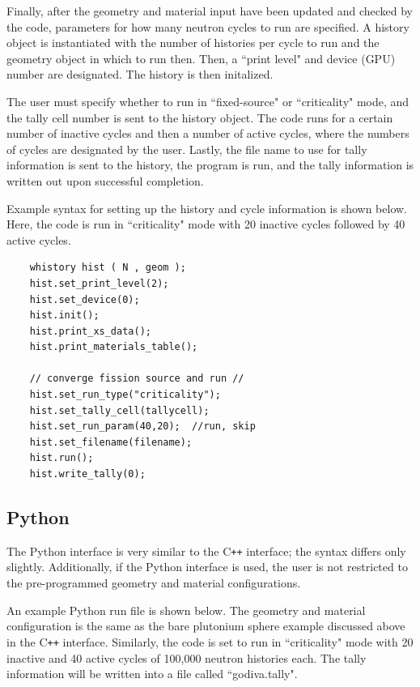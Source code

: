 \documentclass[twoside,a4paper]{refart}
\begin{document}
Finally, after the geometry and material input have been updated and checked by the code, parameters for how many neutron cycles to run are specified. A history object is instantiated with the number of
histories per cycle to run and the geometry object in which to run then. Then, a ``print level" and 
device (GPU) number are designated. The history is then initalized.

The user must specify whether to run in ``fixed-source" or ``criticality" mode, and the tally cell number
is sent to the history object. The code runs for a certain number of inactive cycles and then a number of
active cycles, where the numbers of cycles are designated by the user. Lastly, the file name to use for
tally information is sent to the history, the program is run, and the tally information is written out
upon successful completion.

Example syntax for setting up the history and cycle information is shown below. Here, the code is run in
``criticality" mode with 20 inactive cycles followed by 40 active cycles.

\begin{verbatim}
	whistory hist ( N , geom );
	hist.set_print_level(2);
	hist.set_device(0);
	hist.init();
	hist.print_xs_data();
	hist.print_materials_table();

	// converge fission source and run //
	hist.set_run_type("criticality");
	hist.set_tally_cell(tallycell);
	hist.set_run_param(40,20);  //run, skip
	hist.set_filename(filename);
	hist.run();
	hist.write_tally(0);
\end{verbatim}

\subsection{Python}

The Python interface is very similar to the C\texttt{++} interface; the syntax differs only slightly.
Additionally, if the Python interface is used, the user is not restricted to the pre-programmed 
geometry and material configurations.

An example Python run file is shown below. The geometry and material configuration is the same as the
bare plutonium sphere example discussed above in the C\texttt{++} interface. Similarly, the code is set
to run in ``criticality" mode with 20 inactive and 40 active cycles of 100,000 neutron histories each.
The tally information will be written into a file called ``godiva.tally".
\end{document}
